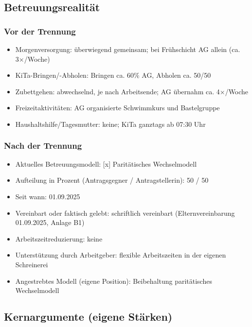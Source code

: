 \documentclass[
  11pt,
  a4paper,
]{article}
\providecommand{\tightlist}{%
  \setlength{\itemsep}{0pt}\setlength{\parskip}{0pt}}
\begin{document}
\subsection{Betreuungsrealität}\label{betreuungsrealituxe4t}

\subsubsection{Vor der Trennung}\label{vor-der-trennung}

\begin{itemize}
\tightlist
\item
  Morgenversorgung: überwiegend gemeinsam; bei Frühschicht AG allein
  (ca. 3×/Woche)
\item
  KiTa-Bringen/-Abholen: Bringen ca. 60\% AG, Abholen ca. 50/50
\item
  Zubettgehen: abwechselnd, je nach Arbeitsende; AG übernahm ca.
  4×/Woche
\item
  Freizeitaktivitäten: AG organisierte Schwimmkurs und Bastelgruppe
\item
  Haushaltshilfe/Tagesmutter: keine; KiTa ganztags ab 07:30 Uhr
\end{itemize}

\subsubsection{Nach der Trennung}\label{nach-der-trennung}

\begin{itemize}
\tightlist
\item
  Aktuelles Betreuungsmodell: {[}x{]} Paritätisches Wechselmodell
\item
  Aufteilung in Prozent (Antragsgegner / Antragstellerin): 50 / 50
\item
  Seit wann: 01.09.2025
\item
  Vereinbart oder faktisch gelebt: schriftlich vereinbart
  (Elternvereinbarung 01.09.2025, Anlage B1)
\item
  Arbeitszeitreduzierung: keine
\item
  Unterstützung durch Arbeitgeber: flexible Arbeitszeiten in der eigenen
  Schreinerei
\item
  Angestrebtes Modell (eigene Position): Beibehaltung paritätisches
  Wechselmodell
\end{itemize}

\subsection{Kernargumente (eigene
Stärken)}\label{kernargumente-eigene-stuxe4rken}
\end{document}
